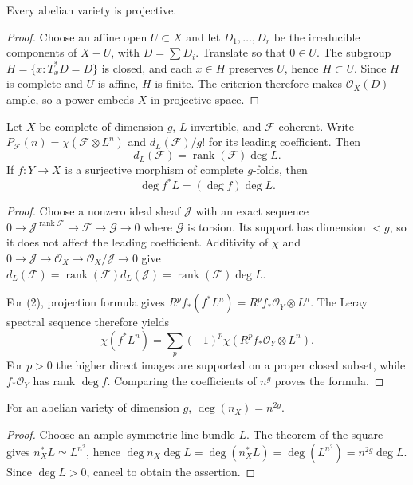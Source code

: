 \begin{theorem}
\label{mumford-thm-abelian-projective}
Every abelian variety is projective.
\end{theorem}
\begin{proof}
Choose an affine open $U\subset X$ and let $D_1,\ldots,D_r$ be the
irreducible components of $X-U$, with $D=\sum D_i$.  Translate so that
$0\in U$.  The subgroup $H=\{x:T_x^*D=D\}$ is closed, and each $x\in H$
preserves $U$, hence $H\subset U$.  Since $H$ is complete and $U$ is affine,
$H$ is finite.  The criterion therefore makes $\mathcal O_X(D)$ ample, so a
power embeds $X$ in projective space.
\end{proof}

\begin{proposition}
\label{mumford-prop-degree-hilbert}
Let $X$ be complete of dimension $g$, $L$ invertible, and $\mathcal F$ coherent.
Write $P_{\mathcal F}(n)=\chi(\mathcal F\otimes L^n)$ and
$d_L(\mathcal F)/g!$ for its leading coefficient.  Then
\[
d_L(\mathcal F)=\operatorname{rank}(\mathcal F)\deg L.
\]
If $f:Y\to X$ is a surjective morphism of complete $g$-folds, then
\[
\deg f^*L=(\deg f)\deg L.
\]
\end{proposition}
\begin{proof}
Choose a nonzero ideal sheaf $\mathcal J$ with an exact sequence
$0\to\mathcal J^{\operatorname{rank}\mathcal F}\to\mathcal F\to\mathcal G\to0$
where $\mathcal G$ is torsion.  Its support has dimension $<g$, so it does
not affect the leading coefficient.  Additivity of $\chi$ and
$0\to\mathcal J\to\mathcal O_X\to\mathcal O_X/\mathcal J\to0$ give
$d_L(\mathcal F)=\operatorname{rank}(\mathcal F)d_L(\mathcal J)
=\operatorname{rank}(\mathcal F)\deg L$.

For (2), projection formula gives
$R^pf_*(f^*L^n)=R^pf_*\mathcal O_Y\otimes L^n$.  The Leray spectral sequence
therefore yields
\[
\chi(f^*L^n)=\sum_p(-1)^p\chi(R^pf_*\mathcal O_Y\otimes L^n).
\]
For $p>0$ the higher direct images are supported on a proper closed subset,
while $f_*\mathcal O_Y$ has rank $\deg f$.  Comparing the coefficients of
$n^g$ proves the formula.
\end{proof}

\begin{corollary}
\label{mumford-cor-degree-multiplication-appendix}
For an abelian variety of dimension $g$, $\deg(n_X)=n^{2g}$.
\end{corollary}
\begin{proof}
Choose an ample symmetric line bundle $L$.  The theorem of the square gives
$n_X^*L\simeq L^{n^2}$, hence
$\deg n_X\deg L=\deg(n_X^*L)=\deg(L^{n^2})=n^{2g}\deg L$.
Since $\deg L>0$, cancel to obtain the assertion.
\end{proof}

